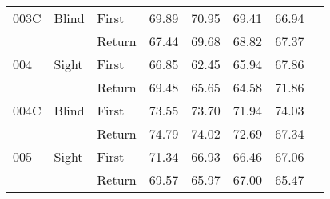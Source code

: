 \begin{table}[!htb]
\begin{tabular}{lllrrrrr}
003C & Blind & First &  69.89 &                                                 70.95 &                                                  69.41 &   66.94 \\
    &       & Return &  67.44 &                                                 69.68 &                                                  68.82 &   67.37 \\
004 & Sight & First &  66.85 &                                                 62.45 &                                                  65.94 &   67.86 \\
    &       & Return &  69.48 &                                                 65.65 &                                                  64.58 &   71.86 \\
004C & Blind & First &  73.55 &                                                 73.70 &                                                  71.94 &   74.03 \\
    &       & Return &  74.79 &                                                 74.02 &                                                  72.69 &   67.34 \\
005 & Sight & First &  71.34 &                                                 66.93 &                                                  66.46 &   67.06 \\
    &       & Return &  69.57 &                                                 65.97 &                                                  67.00 &   65.47 \\
\bottomrule
\end{tabular}
\end{table}

